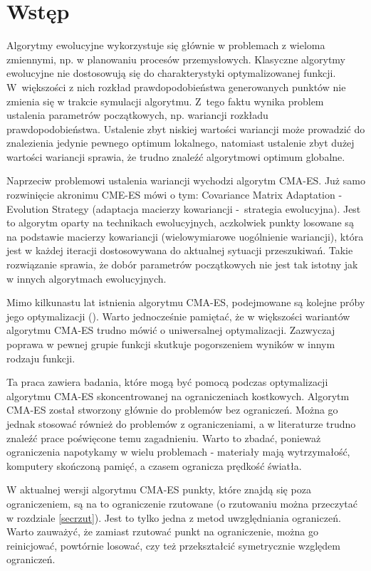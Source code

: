 \documentclass{mini}
\begin{document}
\pagebreak

\section{Wstęp}
Algorytmy ewolucyjne wykorzystuje się głównie w problemach z wieloma zmiennymi, np. w planowaniu procesów przemysłowych.\cite{zast} Klasyczne algorytmy ewolucyjne nie dostosowują się do charakterystyki optymalizowanej funkcji. W~większości z nich rozkład prawdopodobieństwa generowanych punktów nie zmienia się w trakcie symulacji algorytmu. Z~tego faktu wynika problem ustalenia parametrów początkowych, np. wariancji rozkładu prawdopodobieństwa. Ustalenie zbyt niskiej wartości wariancji może prowadzić do znalezienia jedynie pewnego optimum lokalnego, natomiast ustalenie zbyt dużej wartości wariancji sprawia, że trudno znaleźć algorytmowi optimum globalne.

Naprzeciw problemowi ustalenia wariancji wychodzi algorytm CMA-ES. Już samo rozwinięcie akronimu CME-ES mówi o tym: Covariance Matrix Adaptation - Evolution Strategy (adaptacja macierzy kowariancji -~strategia ewolucyjna). Jest to algorytm oparty na technikach ewolucyjnych, aczkolwiek punkty losowane są na podstawie macierzy kowariancji (wielowymiarowe uogólnienie wariancji), która jest w każdej iteracji dostosowywana do aktualnej sytuacji przeszukiwań. Takie rozwiązanie sprawia, że dobór parametrów początkowych nie jest tak istotny jak w innych algorytmach ewolucyjnych.

Mimo kilkunastu lat istnienia algorytmu CMA-ES, podejmowane są kolejne próby jego optymalizacji (\cite{magist}\cite{lcmaes}). Warto jednocześnie pamiętać, że w większości wariantów algorytmu CMA-ES trudno mówić o uniwersalnej optymalizacji. Zazwyczaj poprawa w pewnej grupie funkcji skutkuje pogorszeniem wyników w innym rodzaju funkcji.

Ta praca zawiera badania, które mogą być pomocą podczas optymalizacji algorytmu CMA-ES skoncentrowanej na ograniczeniach kostkowych. Algorytm CMA-ES został stworzony głównie do problemów bez ograniczeń. Można go jednak stosować również do problemów z ograniczeniami, a w literaturze trudno znaleźć prace poświęcone temu zagadnieniu. Warto to zbadać, ponieważ ograniczenia napotykamy w wielu problemach - materiały mają wytrzymałość, komputery skończoną pamięć, a czasem ogranicza prędkość światła.

W aktualnej wersji algorytmu CMA-ES punkty, które znajdą się poza ograniczeniem, są na to ograniczenie rzutowane (o rzutowaniu można przeczytać w rozdziale \ref{secrzut}). Jest to tylko jedna z metod uwzględniania ograniczeń. Warto zauważyć, że zamiast rzutować punkt na ograniczenie, można go reinicjować, powtórnie losować, czy też przekształcić symetrycznie względem ograniczeń.
\end{document}
